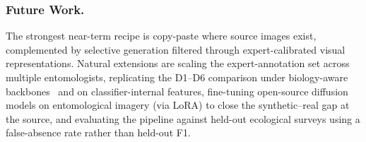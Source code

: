\documentclass[runningheads]{llncs}
\begin{document}
\subsubsection{Future Work.}
The strongest near-term recipe is copy-paste where source images exist,
complemented by selective generation filtered through expert-calibrated
visual representations. Natural extensions are scaling the
expert-annotation set across multiple entomologists, replicating the
D1--D6 comparison under biology-aware
backbones~\cite{stevens_bioclip_2024, oquab_dinov2_2024} and on
classifier-internal features, fine-tuning open-source diffusion models
on entomological imagery (\eg via LoRA) to close the synthetic--real gap
at the source, and evaluating the pipeline against held-out ecological
surveys using a false-absence rate rather than held-out F1.




\end{document}
